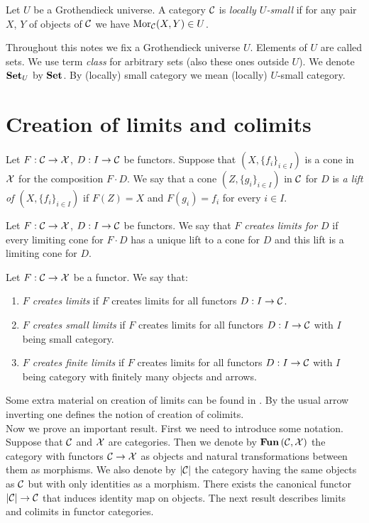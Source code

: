 \begin{definition}
Let $U$ be a Grothendieck universe. A category ${\mathcal C}$ is \textit{locally $U$-small} if for any pair $X$, $Y$ of objects of ${\mathcal C}$ we have $\mathrm{Mor}_{{\mathcal C}}(X,Y)\in U$.
\end{definition}
\noindent
Throughout this notes we fix a Grothendieck universe $U$. Elements of $U$ are called sets. We use term \textit{class} for arbitrary sets (also these ones outside $U$). We denote $\mathbf{Set}_U$ by $\mathbf{Set}$. By (locally) small category we mean (locally) $U$-small category. 

\section{Creation of limits and colimits}

\begin{definition}
Let $F:{\mathcal C}\rightarrow {\mathcal X}$, $D:I\rightarrow {\mathcal C}$ be functors. Suppose that $\left(X,\{f_i\}_{i\in I}\right)$ is a cone in ${\mathcal X}$ for the composition $F\cdot D$. We say that a cone $\left(Z,\{g_i\}_{i\in I}\right)$ in ${\mathcal C}$ for $D$ is \textit{a lift of $\left(X,\{f_i\}_{i\in I}\right)$} if $F(Z)=X$ and $F(g_i)=f_i$ for every $i\in I$.
\end{definition}

\begin{definition}
Let $F:{\mathcal C}\rightarrow {\mathcal X}$, $D:I\rightarrow {\mathcal C}$ be functors. We say that \textit{$F$ creates limits for $D$} if every limiting cone for $F\cdot D$ has a unique lift to a cone for $D$ and this lift is a limiting cone for $D$.
\end{definition}

\begin{definition}
Let $F:{\mathcal C}\rightarrow {\mathcal X}$ be a functor. We say that:
\begin{enumerate}[label=\textbf{(\arabic*)}, leftmargin=1.5em]
\item \textit{$F$ creates limits} if $F$ creates limits for all functors $D:I\rightarrow {\mathcal C}$.
\item \textit{$F$ creates small limits} if $F$ creates limits for all functors $D:I\rightarrow {\mathcal C}$ with $I$ being small category.
\item \textit{$F$ creates finite limits} if $F$ creates limits for all functors $D:I\rightarrow {\mathcal C}$ with $I$ being category with finitely many objects and arrows.
\end{enumerate}
\end{definition}
\noindent
Some extra material on creation of limits can be found in {\cite[V.1]{Maclane}}. By the usual arrow inverting one defines the notion of creation of colimits.\\
Now we prove an important result. First we need to introduce some notation. Suppose that ${\mathcal C}$ and ${\mathcal X}$ are categories. Then we denote by $\mathbf{Fun}\left({\mathcal C},{\mathcal X}\right)$ the category with functors ${\mathcal C}\rightarrow {\mathcal X}$ as objects and natural transformations between them as morphisms. We also denote by $|{\mathcal C}|$ the category having the same objects as ${\mathcal C}$ but with only identities as a morphism. There exists the canonical functor $|{\mathcal C}|\rightarrow {\mathcal C}$ that induces identity map on objects. The next result describes limits and colimits in functor categories.


